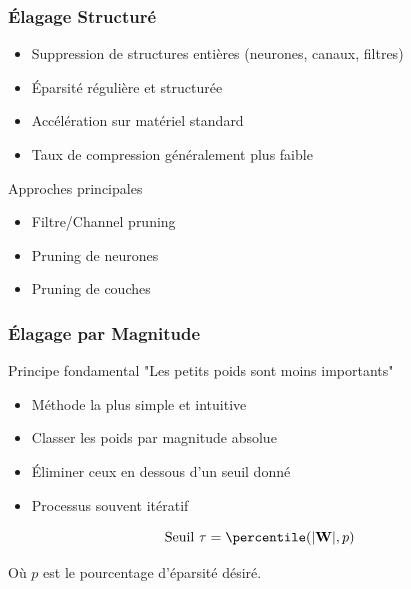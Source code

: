 \documentclass[10pt]{beamer}
\begin{document}
\begin{frame}
\frametitle{Élagage Structuré}
\begin{itemize}
    \item Suppression de structures entières (neurones, canaux, filtres)
    \item Éparsité régulière et structurée
    \item Accélération sur matériel standard
    \item Taux de compression généralement plus faible
\end{itemize}

\begin{block}{Approches principales}
\begin{itemize}
    \item Filtre/Channel pruning
    \item Pruning de neurones
    \item Pruning de couches
\end{itemize}
\end{block}
\end{frame}

\begin{frame}
\frametitle{Élagage par Magnitude}
\begin{alertblock}{Principe fondamental}
"Les petits poids sont moins importants"
\end{alertblock}

\begin{itemize}
    \item Méthode la plus simple et intuitive
    \item Classer les poids par magnitude absolue
    \item Éliminer ceux en dessous d'un seuil donné
    \item Processus souvent itératif
\end{itemize}

\begin{equation}
\text{Seuil } \tau = \percentile(|\mathbf{W}|, p)
\end{equation}

Où $p$ est le pourcentage d'éparsité désiré.
\end{frame}
\end{document}
